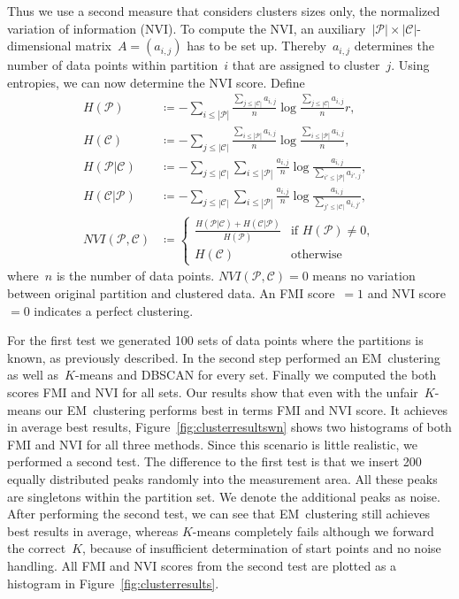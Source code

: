\documentclass{article}
\begin{document}
Thus we use a second measure that considers clusters sizes only, the normalized variation of information (NVI).
To compute the NVI, an auxiliary~$|\mathcal{P}| \times |\mathcal{C}|$-dimensional matrix~$A = (a_{i,j})$ has to be set up.
Thereby~$a_{i,j}$ determines the number of data points within partition~$i$ that are assigned to cluster~$j$.
Using entropies, we can now determine the NVI score.
Define
\begin{align*}
H(\mathcal{P}) &\coloneq -\sum_{i \leq |\mathcal{P}|} \frac{ \sum_{j \leq |\mathcal{C}|} a_{i,j} }{n} \log \frac{ \sum_{j \leq |\mathcal{C}|} a_{i,j} }{n}r, \\
H(\mathcal{C}) &\coloneq -\sum_{j \leq |\mathcal{C}|} \frac{ \sum_{i \leq |\mathcal{P}|} a_{i,j} }{n} \log \frac{ \sum_{i \leq |\mathcal{P}|} a_{i,j} }{n}, \\
H(\mathcal{P} | \mathcal{C}) &\coloneq -\sum_{j \leq |\mathcal{C}|} \sum_{i \leq |\mathcal{P}|} \frac{a_{i,j}}{n} \log \frac{a_{i,j}}{\sum_{i' \leq |\mathcal{P}|}a_{i',j}},  \\
H(\mathcal{C} | \mathcal{P}) &\coloneq -\sum_{j \leq |\mathcal{C}|} \sum_{i \leq |\mathcal{P}|} \frac{a_{i,j}}{n} \log \frac{a_{i,j}}{\sum_{j' \leq |\mathcal{C}|}a_{i,j'}},  \\
NVI(\mathcal{P}, \mathcal{C}) &\coloneq  
\begin{cases}
    \frac{H(\mathcal{P} | \mathcal{C}) + H(\mathcal{C} | \mathcal{P})}{H(\mathcal{P})} & \text{if } H(\mathcal{P}) \neq 0, \\
    H(\mathcal{C})              & \text{otherwise}
\end{cases}
\end{align*}
where~$n$ is the number of data points.
$NVI(\mathcal{P}, \mathcal{C}) = 0$ means no variation between original partition and clustered data.
An FMI score~$= 1$ and NVI score~$ = 0$ indicates a perfect clustering.

For the first test we generated 100 sets of data points where the partitions is known, as previously described.
In the second step performed an EM~clustering as well as~$K$-means and DBSCAN for every set.
Finally we computed the both scores FMI and NVI for all sets.
Our results show that even with the unfair~$K$-means our EM~clustering performs best in terms FMI and NVI score.
It achieves in average best results, Figure~\ref{fig:clusterresultswn} shows two histograms of both FMI and NVI for all three methods.
Since this scenario is little realistic, we performed a second test.
The difference to the first test is that we insert 200 equally distributed peaks randomly into the measurement area.
All these peaks are singletons within the partition set.
We denote the additional peaks as noise.
After performing the second test, we can see that EM~clustering still achieves best results in average, whereas  $K$-means completely fails although we forward the correct~$K$, because of insufficient determination of start points and no noise handling.
All FMI and NVI scores from the second test are plotted as a histogram in Figure~\ref{fig:clusterresults}.
\end{document}
